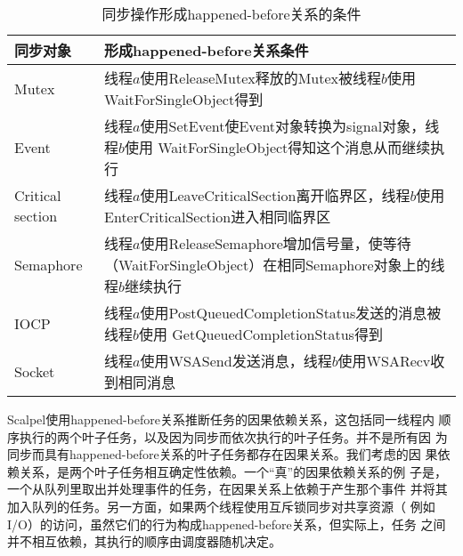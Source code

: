 \begin{table}
\centering
\begin{minipage}{0.8\linewidth}
\centering
\caption{同步操作形成happened-before关系的条件}
\label{fig:sync_dependency}
\begin{tabular}{lp{8cm}}

\toprule[1.5pt]
同步对象 & 形成happened-before关系条件 \\
\midrule[1pt]
Mutex & 线程$a$使用ReleaseMutex释放的Mutex被线程$b$使用
WaitForSingleObject得到 \\

\midrule[1pt]
Event & 线程$a$使用SetEvent使Event对象转换为signal对象，线程$b$使用
WaitForSingleObject得知这个消息从而继续执行 \\

\midrule[1pt]
Critical section & 线程$a$使用LeaveCriticalSection离开临界区，线程$b$使用
EnterCriticalSection进入相同临界区 \\

\midrule[1pt]
Semaphore & 线程$a$使用ReleaseSemaphore增加信号量，使等待
（WaitForSingleObject）在相同Semaphore对象上的线程$b$继续执行 \\

\midrule[1pt]
IOCP & 线程$a$使用PostQueuedCompletionStatus发送的消息被线程$b$使用
GetQueuedCompletionStatus得到 \\

\midrule[1pt]
Socket & 线程$a$使用WSASend发送消息，线程$b$使用WSARecv收到相同消息 \\

\bottomrule[1.5pt]
\end{tabular}
\end{minipage}
\end{table}

%

Scalpel使用happened-before关系推断任务的因果依赖关系，这包括同一线程内
顺序执行的两个叶子任务，以及因为同步而依次执行的叶子任务。并不是所有因
为同步而具有happened-before关系的叶子任务都存在因果关系。我们考虑的因
果依赖关系，是两个叶子任务相互确定性依赖。一个“真”的因果依赖关系的例
子是，一个从队列里取出并处理事件的任务，在因果关系上依赖于产生那个事件
并将其加入队列的任务。另一方面，如果两个线程使用互斥锁同步对共享资源（
例如I/O）的访问，虽然它们的行为构成happened-before关系，但实际上，任务
之间并不相互依赖，其执行的顺序由调度器随机决定。

